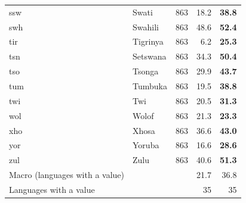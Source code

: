 {\begin{longtable}{@{}llrrr@{}}
ssw & Swati & 863 & 18.2 & \textbf{38.8} \\
swh & Swahili & 863 & 48.6 & \textbf{52.4} \\
tir & Tigrinya & 863 & 6.2 & \textbf{25.3} \\
tsn & Setswana & 863 & 34.3 & \textbf{50.4} \\
tso & Tsonga & 863 & 29.9 & \textbf{43.7} \\
tum & Tumbuka & 863 & 19.5 & \textbf{38.8} \\
twi & Twi & 863 & 20.5 & \textbf{31.3} \\
wol & Wolof & 863 & 21.3 & \textbf{23.3} \\
xho & Xhosa & 863 & 36.6 & \textbf{43.0} \\
yor & Yoruba & 863 & 16.6 & \textbf{28.6} \\
zul & Zulu & 863 & 40.6 & \textbf{51.3} \\
\midrule
Macro (languages with a value) & & & 21.7 & 36.8 \\
Languages with a value & & & 35 & 35 \\
\end{longtable}}


